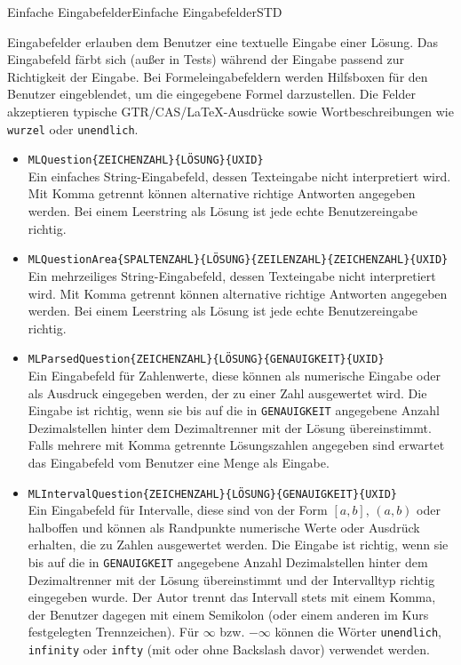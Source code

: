 \begin{MXContent}{Einfache Eingabefelder}{Einfache Eingabefelder}{STD}

\begin{MInfo}
Eingabefelder erlauben dem Benutzer eine textuelle Eingabe einer Lösung. Das Eingabefeld färbt sich (außer in Tests) während der Eingabe passend zur Richtigkeit der Eingabe.
Bei Formeleingabefeldern werden Hilfsboxen für den Benutzer eingeblendet, um die eingegebene Formel darzustellen.
Die Felder akzeptieren typische GTR/CAS/LaTeX-Ausdrücke sowie Wortbeschreibungen wie \texttt{wurzel} oder \texttt{unendlich}.
\begin{itemize}
\item{\texttt{MLQuestion\{ZEICHENZAHL\}\{LÖSUNG\}\{UXID\}}\\
Ein einfaches String-Eingabefeld, dessen Texteingabe nicht interpretiert wird. Mit Komma getrennt können alternative richtige Antworten angegeben werden.
Bei einem Leerstring als Lösung ist jede echte Benutzereingabe richtig.}
\item{\texttt{MLQuestionArea\{SPALTENZAHL\}\{LÖSUNG\}\{ZEILENZAHL\}\{ZEICHENZAHL\}\{UXID\}}\\
Ein mehrzeiliges String-Eingabefeld, dessen Texteingabe nicht interpretiert wird. Mit Komma getrennt können alternative richtige Antworten angegeben werden.
Bei einem Leerstring als Lösung ist jede echte Benutzereingabe richtig.}
\item{\texttt{MLParsedQuestion\{ZEICHENZAHL\}\{LÖSUNG\}\{GENAUIGKEIT\}\{UXID\}}\\
Ein Eingabefeld für Zahlenwerte, diese können als numerische Eingabe oder als Ausdruck eingegeben werden, der zu einer Zahl ausgewertet wird. Die Eingabe ist richtig,
wenn sie bis auf die in \texttt{GENAUIGKEIT} angegebene Anzahl Dezimalstellen hinter dem Dezimaltrenner mit der Lösung übereinstimmt. Falls mehrere mit Komma getrennte
Lösungszahlen angegeben sind erwartet das Eingabefeld vom Benutzer eine Menge als Eingabe.}
\item{\texttt{MLIntervalQuestion\{ZEICHENZAHL\}\{LÖSUNG\}\{GENAUIGKEIT\}\{UXID\}}\\
Ein Eingabefeld für Intervalle, diese sind von der Form $[a,b]$, $(a,b)$ oder halboffen und können als Randpunkte numerische Werte oder Ausdrück erhalten,
die zu Zahlen ausgewertet werden. Die Eingabe ist richtig,
wenn sie bis auf die in \texttt{GENAUIGKEIT} angegebene Anzahl Dezimalstellen hinter dem Dezimaltrenner mit der Lösung übereinstimmt und der Intervalltyp richtig
eingegeben wurde. Der Autor trennt das Intervall stets mit einem Komma, der Benutzer dagegen mit einem Semikolon (oder einem anderen im Kurs
festgelegten Trennzeichen). Für $\infty$ bzw. $-\infty$ können die Wörter \texttt{unendlich}, \texttt{infinity} oder \texttt{infty} (mit oder ohne Backslash davor)
verwendet werden.}
\end{itemize}
\end{MInfo}


\end{MXContent}
